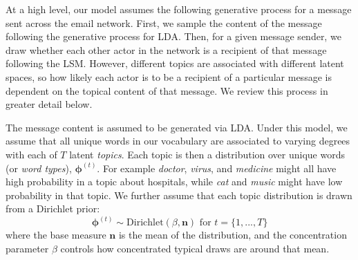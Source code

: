 \documentclass{pnastwo}
\begin{document}
\begin{article}
At a high level, our model assumes the following generative process for a message sent across the email network. First, we sample the content of the message following the generative process for LDA. Then, for a given message sender, we draw whether each other actor in the network is a recipient of that message following the LSM. However, different topics are associated with different latent spaces, so how likely each actor is to be a recipient of a particular message is dependent on the topical content of that message. We review this process in greater detail below.  


The message content is assumed to be generated via LDA. Under this model, we assume that all unique words in our vocabulary are associated to varying degrees with each of $T$ latent \emph{topics}. Each topic is then a distribution over unique words (or \emph{word types}), $\boldsymbol{\phi}^{(t)}$. For example \emph{doctor}, \emph{virus}, and \emph{medicine} might all have high probability in a topic about hospitals, while \emph{cat} and \emph{music} might have low probability in that topic. We further assume that each topic distribution is drawn from a Dirichlet prior: 
\begin{equation}
	\boldsymbol{\phi}^{(t)} \sim \text{Dirichlet}(\beta,\boldsymbol{n}) \text{ for } t = \{1, ..., T\}
\end{equation}
where the base measure $\boldsymbol{n}$ is the mean of the distribution, and the concentration parameter $\beta$ controls how concentrated typical draws are around that mean. 


\end{article}
\end{document}
